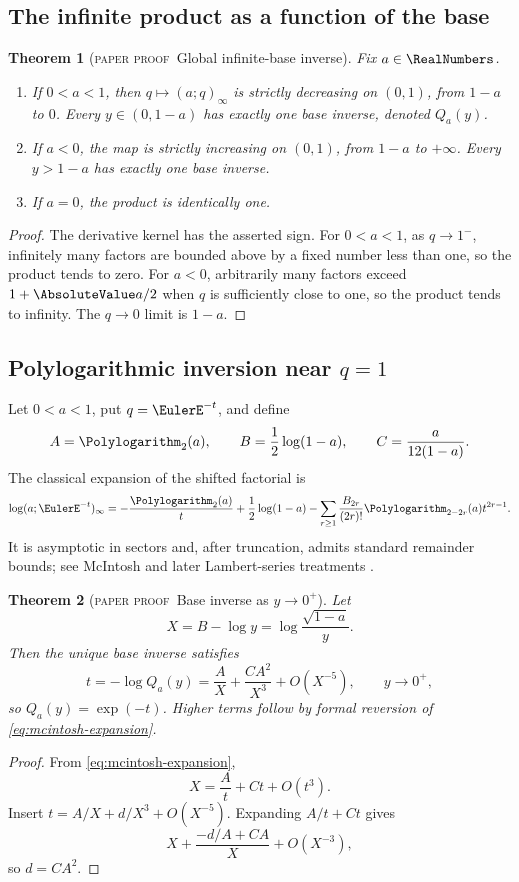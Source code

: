 \documentclass[11pt,oneside]{article}
\newtheorem{theorem}{Theorem}[section]
\theoremstyle{definition}
\theoremstyle{remark}
\theoremstyle{plain}
\theoremstyle{definition}
\theoremstyle{remark}
\newcommand{\statusproved}{\textcolor{provedgreen}{\textsc{paper proof}}}
\numberwithin{equation}{section}
\numberwithin{figure}{section}
\numberwithin{table}{section}
\let\reportsubsection\subsection
\let\reportsubsubsection\subsubsection
\let\section\reportsubsection
\let\subsection\reportsubsubsection
\begin{document}
\section{The infinite product as a function of the base}
\begin{theorem}[\statusproved\ Global infinite-base inverse]
Fix \(a\in\RealNumbers\).
\begin{enumerate}[label=(\roman*)]
\item If \(0<a<1\), then \(q\mapsto(a;q)_\infty\) is strictly decreasing on
\((0,1)\), from \(1-a\) to \(0\).  Every \(y\in(0,1-a)\) has exactly one base
inverse, denoted \(Q_a(y)\).
\item If \(a<0\), the map is strictly increasing on \((0,1)\), from \(1-a\) to
\(+\infty\).  Every \(y>1-a\) has exactly one base inverse.
\item If \(a=0\), the product is identically one.
\end{enumerate}
\end{theorem}
\begin{proof}
The derivative kernel has the asserted sign.  For \(0<a<1\), as \(q\to1^-\),
infinitely many factors are bounded above by a fixed number less than one, so
the product tends to zero.  For \(a<0\), arbitrarily many factors exceed
\(1+\AbsoluteValue a/2\) when \(q\) is sufficiently close to one, so the product tends to
infinity.  The \(q\to0\) limit is \(1-a\).
\end{proof}

\section{Polylogarithmic inversion near \(q=1\)}
Let \(0<a<1\), put \(q=\EulerE^{-t}\), and define
\[
 A=\Polylogarithm_2(a),
 \qquad B=\frac12\log(1-a),
 \qquad C=\frac{a}{12(1-a)}.
\]
The classical expansion of the shifted factorial is
\begin{equation}
 \log(a;\EulerE^{-t})_\infty
 =-\frac{\Polylogarithm_2(a)}t+\frac12\log(1-a)
 -\sum_{r\ge1}\frac{B_{2r}}{(2r)!}
 \Polylogarithm_{2-2r}(a)t^{2r-1}.
 \label{eq:mcintosh-expansion}
\end{equation}
It is asymptotic in sectors and, after truncation, admits standard remainder
bounds; see McIntosh \cite{McIntosh1999} and later Lambert-series treatments
\cite{BanerjeeWilkerson}.

\begin{theorem}[\statusproved\ Base inverse as \(y\to0^+\)]
Let
\[
 X=B-\log y=\log\frac{\sqrt{1-a}}{y}.
\]
Then the unique base inverse satisfies
\begin{equation}
 t=-\log Q_a(y)
 =\frac{A}{X}+\frac{CA^2}{X^3}+O(X^{-5}),
 \qquad y\to0^+,
 \label{eq:qbase-inverse-near1}
\end{equation}
so \(Q_a(y)=\exp(-t)\).  Higher terms follow by formal reversion of
\eqref{eq:mcintosh-expansion}.
\end{theorem}
\begin{proof}
From \eqref{eq:mcintosh-expansion},
\[
 X=\frac At+Ct+O(t^3).
\]
Insert \(t=A/X+d/X^3+O(X^{-5})\).  Expanding \(A/t+Ct\) gives
\[
 X+\frac{-d/A+CA}{X}+O(X^{-3}),
\]
so \(d=CA^2\).
\end{proof}
\end{document}
